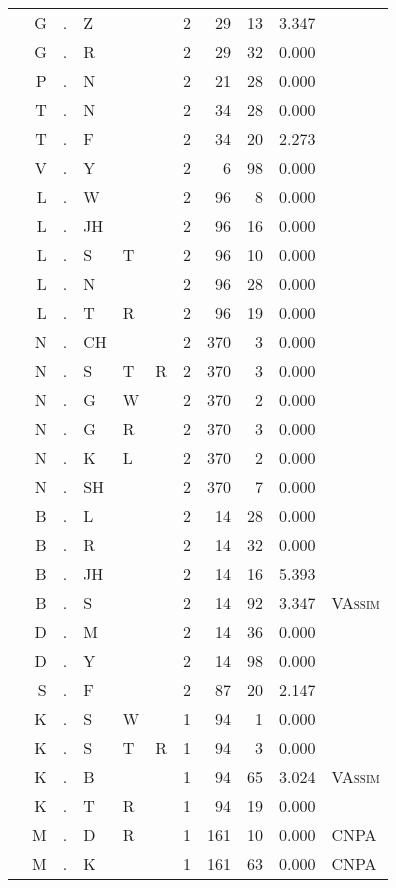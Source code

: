 \begin{longtable}{r@{ } r@{ } c@{ } l@{ } l@{ } l@{ } r r r r l }
 & G & . & Z &  &  & 2 & 29 & 13 & 3.347 &  \\
 & G & . & R &  &  & 2 & 29 & 32 & 0.000 &  \\
 & P & . & N &  &  & 2 & 21 & 28 & 0.000 &  \\
 & T & . & N &  &  & 2 & 34 & 28 & 0.000 &  \\
 & T & . & F &  &  & 2 & 34 & 20 & 2.273 &  \\
 & V & . & Y &  &  & 2 & 6 & 98 & 0.000 &  \\
 & L & . & W &  &  & 2 & 96 & 8 & 0.000 &  \\
 & L & . & JH &  &  & 2 & 96 & 16 & 0.000 &  \\
 & L & . & S & T &  & 2 & 96 & 10 & 0.000 &  \\
 & L & . & N &  &  & 2 & 96 & 28 & 0.000 &  \\
 & L & . & T & R &  & 2 & 96 & 19 & 0.000 &  \\
 & N & . & CH &  &  & 2 & 370 & 3 & 0.000 &  \\
 & N & . & S & T & R & 2 & 370 & 3 & 0.000 &  \\
 & N & . & G & W &  & 2 & 370 & 2 & 0.000 &  \\
 & N & . & G & R &  & 2 & 370 & 3 & 0.000 &  \\
 & N & . & K & L &  & 2 & 370 & 2 & 0.000 &  \\
 & N & . & SH &  &  & 2 & 370 & 7 & 0.000 &  \\
 & B & . & L &  &  & 2 & 14 & 28 & 0.000 &  \\
 & B & . & R &  &  & 2 & 14 & 32 & 0.000 &  \\
 & B & . & JH &  &  & 2 & 14 & 16 & 5.393 &  \\
 & B & . & S &  &  & 2 & 14 & 92 & 3.347 & \textsc{VAssim} \\
 & D & . & M &  &  & 2 & 14 & 36 & 0.000 &  \\
 & D & . & Y &  &  & 2 & 14 & 98 & 0.000 &  \\
 & S & . & F &  &  & 2 & 87 & 20 & 2.147 &  \\
 & K & . & S & W &  & 1 & 94 & 1 & 0.000 &  \\
 & K & . & S & T & R & 1 & 94 & 3 & 0.000 &  \\
 & K & . & B &  &  & 1 & 94 & 65 & 3.024 & \textsc{VAssim} \\
 & K & . & T & R &  & 1 & 94 & 19 & 0.000 &  \\
 & M & . & D & R &  & 1 & 161 & 10 & 0.000 & \textsc{CNPA} \\
 & M & . & K &  &  & 1 & 161 & 63 & 0.000 & \textsc{CNPA} \\

\end{longtable}
